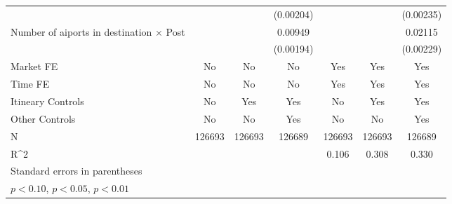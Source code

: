 \begin{table}[htbp]
\begin{tabular}{l*{6}{c}}
                    &                     &                     &   (0.00204)         &                     &                     &   (0.00235)         \\
\addlinespace
Number of aiports in destination $\times$ Post&                     &                     &     0.00949\sym{***}&                     &                     &     0.02115\sym{***}\\
                    &                     &                     &   (0.00194)         &                     &                     &   (0.00229)         \\
\midrule
Market FE           &          No         &          No         &          No         &         Yes         &         Yes         &         Yes         \\
Time FE             &          No         &          No         &          No         &         Yes         &         Yes         &         Yes         \\
Itineary Controls   &          No         &         Yes         &         Yes         &          No         &         Yes         &         Yes         \\
Other Controls      &          No         &          No         &         Yes         &          No         &          No         &         Yes         \\
N                   &      126693         &      126693         &      126689         &      126693         &      126693         &      126689         \\
R^2                 &                     &                     &                     &       0.106         &       0.308         &       0.330         \\
\bottomrule
\multicolumn{7}{l}{\footnotesize Standard errors in parentheses}\\
\multicolumn{7}{l}{\footnotesize \sym{*} \(p<0.10\), \sym{**} \(p<0.05\), \sym{***} \(p<0.01\)}\\
\end{tabular}
\end{table}
